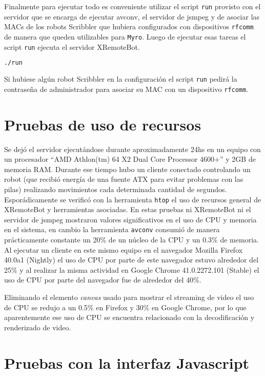 Finalmente para ejecutar todo es conveniente utilizar el script
\texttt{run} provisto con el servidor que se encarga de ejecutar
avconv, el servidor de jsmpeg y de asociar las MACs de los
robots Scribbler que hubiera configurados con dispositivos
\texttt{rfcomm} de manera que queden utilizables para \texttt{Myro}.
Luego de ejecutar esas tareas el script \texttt{run} ejecuta
el servidor XRemoteBot.

\begin{lstlisting}[language=bash,
caption={Ejecutar el servidor y procesos asociados},
label=lst:ejecutar_xremotebot]
./run
\end{lstlisting}

Si hubiese algún robot Scribbler en la configuración el script
\texttt{run} pedirá la contraseña de administrador para asociar
su MAC con un dispositivo \texttt{rfcomm}.

\section{Pruebas de uso de recursos}
Se dejó el servidor ejecutándose durante aproximadamente 24hs en
un equipo con un procesador
``AMD Athlon(tm) 64 X2 Dual Core Processor 4600+'' y 2GB de memoria
RAM. Durante ese tiempo hubo un cliente conectado controlando
un robot (que recibió energía de una fuente ATX para evitar problemas
con las pilas) realizando movimientos cada determinada cantidad de
segundos. Esporádicamente se verificó con la herramienta
\texttt{htop} el uso de recursos general de XRemoteBot y herramientas
asociadas. En estas pruebas ni XRemoteBot ni el servidor de jsmpeg
mostraron valores significativos en el uso de CPU y memoria en
el sistema, en cambio la herramienta \texttt{avconv} consumió
de manera prácticamente constante un 20\% de un núcleo de la CPU
y un 0.3\% de memoria. Al ejecutar un cliente en este mismo
equipo en el navegador Mozilla Firefox 40.0a1 (Nightly)
el uso de CPU por parte de este navegador estuvo alrededor
del 25\% y al realizar la misma actividad
en Google Chrome 41.0.2272.101 (Stable) el uso de CPU por parte
del navegador fue de alrededor del 40\%.

Eliminando el elemento \textit{canvas} usado para
mostrar el streaming de video
el uso de CPU se redujo a un 0.5\% en Firefox y 30\% en Google Chrome,
por lo que aparentemente ese uso de CPU se encuentra relacionado
con la decodificación y renderizado de video.

\section{Pruebas con la interfaz Javascript}

